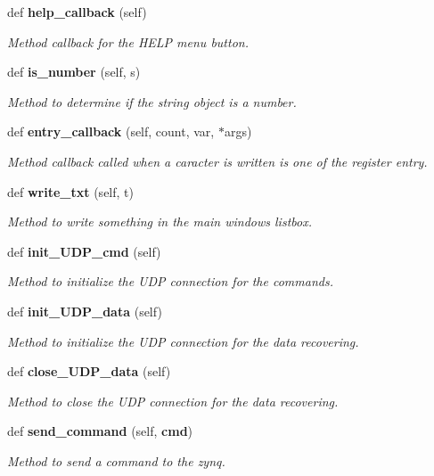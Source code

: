 \begin{DoxyCompactItemize}
def \textbf{ help\+\_\+callback} (self)
\begin{DoxyCompactList}\small\item\em Method callback for the H\+E\+LP menu button. \end{DoxyCompactList}\item 
def \textbf{ is\+\_\+number} (self, s)
\begin{DoxyCompactList}\small\item\em Method to determine if the string object is a number. \end{DoxyCompactList}\item 
def \textbf{ entry\+\_\+callback} (self, count, var, $\ast$args)
\begin{DoxyCompactList}\small\item\em Method callback called when a caracter is written is one of the register entry. \end{DoxyCompactList}\item 
def \textbf{ write\+\_\+txt} (self, t)
\begin{DoxyCompactList}\small\item\em Method to write something in the main window\textquotesingle{}s listbox. \end{DoxyCompactList}\item 
def \textbf{ init\+\_\+\+U\+D\+P\+\_\+cmd} (self)
\begin{DoxyCompactList}\small\item\em Method to initialize the U\+DP connection for the commands. \end{DoxyCompactList}\item 
def \textbf{ init\+\_\+\+U\+D\+P\+\_\+data} (self)
\begin{DoxyCompactList}\small\item\em Method to initialize the U\+DP connection for the data recovering. \end{DoxyCompactList}\item 
def \textbf{ close\+\_\+\+U\+D\+P\+\_\+data} (self)
\begin{DoxyCompactList}\small\item\em Method to close the U\+DP connection for the data recovering. \end{DoxyCompactList}\item 
def \textbf{ send\+\_\+command} (self, \textbf{ cmd})
\begin{DoxyCompactList}\small\item\em Method to send a command to the zynq. \end{DoxyCompactList}\item 

\end{DoxyCompactItemize}
